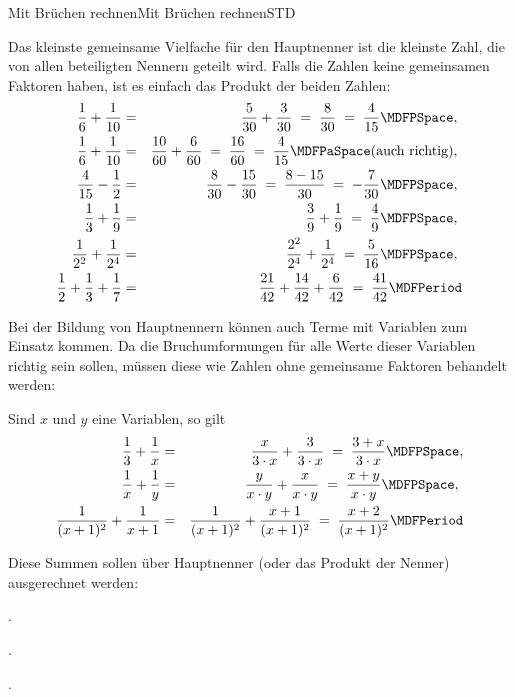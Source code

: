 \begin{MXContent}{Mit Brüchen rechnen}{Mit Brüchen rechnen}{STD}
\begin{MExample}
Das kleinste gemeinsame Vielfache für den Hauptnenner ist die kleinste Zahl,
die von allen beteiligten Nennern geteilt wird. Falls die Zahlen keine gemeinsamen Faktoren haben,
ist es einfach das Produkt der beiden Zahlen:
\begin{eqnarray*}
\Mdfrac{1}{6}+\Mdfrac{1}{10} &=& \Mdfrac{5}{30}+\Mdfrac{3}{30} \;=\; \Mdfrac{8}{30} \;=\; \Mdfrac{4}{15}\MDFPSpace , \ \\
\Mdfrac{1}{6}+\Mdfrac{1}{10} &=& \Mdfrac{10}{60}+\Mdfrac{6}{60} \;=\; \Mdfrac{16}{60} \;=\; \Mdfrac{4}{15}\MDFPaSpace  \text{(auch richtig)}, \ \\
\Mdfrac{4}{15}-\Mdfrac1{2} &=& \Mdfrac{8}{30}-\Mdfrac{15}{30} \;=\; \Mdfrac{8-15}{30} \;=\; -\Mdfrac{7}{30}\MDFPSpace , \ \\
\Mdfrac{1}{3}+\Mdfrac{1}{9} &=& \Mdfrac{3}{9}+\Mdfrac19 \;=\; \Mdfrac49\MDFPSpace ,\ \\
\Mdfrac1{2^2}+\Mdfrac1{2^4} & = & \Mdfrac{2^2}{2^4}+\Mdfrac{1}{2^4} \;=\; \Mdfrac{5}{16}\MDFPSpace ,\ \\
\Mdfrac12+\Mdfrac13+\Mdfrac17 & = & \Mdfrac{21}{42}+\Mdfrac{14}{42}+\Mdfrac{6}{42} \;=\; \Mdfrac{41}{42}\MDFPeriod
\end{eqnarray*}
\end{MExample}

Bei der Bildung von Hauptnennern können auch Terme mit Variablen zum Einsatz kommen.
Da die Bruchumformungen für alle Werte dieser Variablen richtig sein sollen,
müssen diese wie Zahlen ohne gemeinsame Faktoren behandelt werden:

\begin{MExample}
Sind $x$ und $y$ eine Variablen, so gilt
\begin{eqnarray*}
\Mdfrac13+\Mdfrac1x & = & \Mdfrac{x}{3\cdot x}+\Mdfrac{3}{3\cdot x} \; =\; \Mdfrac{3+x}{3\cdot x}\MDFPSpace ,\\
\Mdfrac{1}{x}+\Mdfrac1{y} & = & \Mdfrac{y}{x\cdot y}+\Mdfrac{x}{x\cdot y} \;=\; \Mdfrac{x+y}{x\cdot y}\MDFPSpace ,\ \\
\Mdfrac{1}{(x+1)^2}+\Mdfrac1{x+1} & = & \Mdfrac{1}{(x+1)^2}+\Mdfrac{x+1}{(x+1)^2}\;=\;\Mdfrac{x+2}{(x+1)^2}\MDFPeriod
\end{eqnarray*}
\end{MExample}

\begin{MExercise}
Diese Summen sollen über Hauptnenner (oder das Produkt der Nenner) ausgerechnet werden:
\begin{MExerciseItems}
\item{.}%
\item{.}%
\item{.}%
\end{MExerciseItems}


\end{MExercise}
\end{MXContent}
